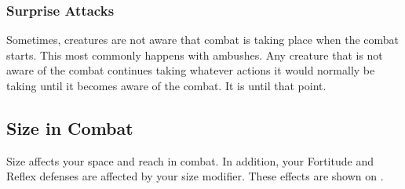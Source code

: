         \subsubsection{Surprise Attacks}\label{Surprise Attacks}
            Sometimes, creatures are not aware that combat is taking place when the combat starts. This most commonly happens with ambushes. Any creature that is not aware of the combat continues taking whatever actions it would normally be taking until it becomes aware of the combat. It is \unaware until that point.

    \subsection{Size in Combat}\label{Size in Combat}
        Size affects your space and reach in combat.
        In addition, your Fortitude and Reflex defenses are affected by your size modifier.
        These effects are shown on .

